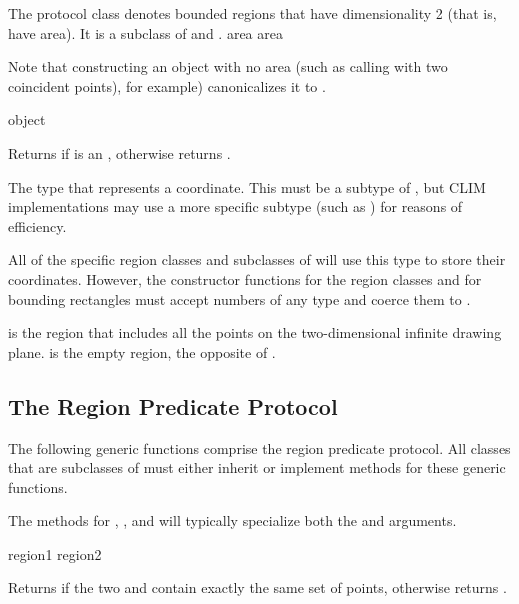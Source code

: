 
The protocol class  denotes bounded regions that have dimensionality 2
(that is, have area).  It is a subclass of  and .
 {area} {area}

Note that constructing an  object with no area (such as calling
 with two coincident points), for example) canonicalizes it
to .

 {object}

Returns  if  is an , otherwise returns
.


The type that represents a coordinate.  This must be a subtype of , but
CLIM implementations may use a more specific subtype (such as )
for reasons of efficiency.

All of the specific region classes and subclasses of 
will use this type to store their coordinates.  However, the constructor
functions for the region classes and for bounding rectangles must accept numbers
of any type and coerce them to .


 is the region that includes all the points on the
two-dimensional infinite drawing plane.  is the empty region, the
opposite of .


\subsection {The Region Predicate Protocol}

The following generic functions comprise the region predicate protocol.  All
classes that are subclasses of  must either inherit or implement
methods for these generic functions.

The methods for , , and
 will typically specialize both the 
and  arguments.


 {region1 region2}

Returns  if the two   and 
contain exactly the same set of points, otherwise returns .

